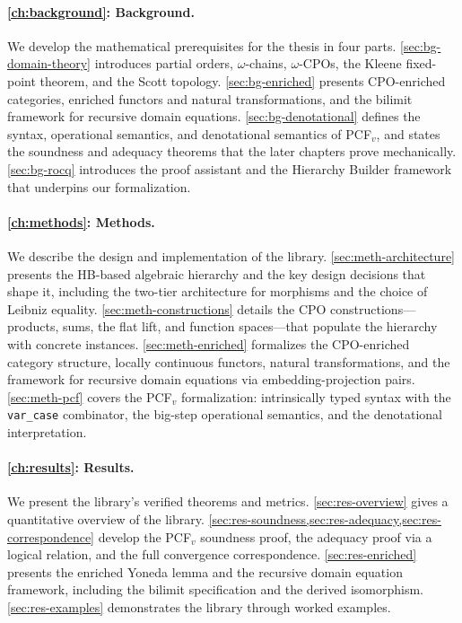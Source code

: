 \paragraph{\cref{ch:background}: Background.}
We develop the mathematical prerequisites for the thesis in four parts.
\cref{sec:bg-domain-theory} introduces partial orders, $\omega$-chains, $\omega$-CPOs, the Kleene
fixed-point theorem, and the Scott topology.
\cref{sec:bg-enriched} presents CPO-enriched categories, enriched functors and natural transformations,
and the bilimit framework for recursive domain equations.
\cref{sec:bg-denotational} defines the syntax, operational semantics, and denotational semantics of PCF$_v$, and
states the soundness and adequacy theorems that the later chapters prove mechanically.
\cref{sec:bg-rocq} introduces the \Rocq{} proof assistant and the Hierarchy Builder framework that
underpins our formalization.

\paragraph{\cref{ch:methods}: Methods.}
We describe the design and implementation of the library.
\cref{sec:meth-architecture} presents the HB-based algebraic hierarchy and the key design decisions
that shape it, including the two-tier architecture for morphisms and the choice of Leibniz equality.
\cref{sec:meth-constructions} details the CPO constructions---products, sums, the flat lift, and
function spaces---that populate the hierarchy with concrete instances.
\cref{sec:meth-enriched} formalizes the CPO-enriched category structure, locally continuous functors,
natural transformations, and the framework for recursive domain equations via embedding-projection
pairs.
\cref{sec:meth-pcf} covers the PCF$_v$ formalization: intrinsically typed syntax with the
\texttt{var\_case} combinator, the big-step operational semantics, and the denotational interpretation.

\paragraph{\cref{ch:results}: Results.}
We present the library's verified theorems and metrics.
\cref{sec:res-overview} gives a quantitative overview of the library.
\cref{sec:res-soundness,sec:res-adequacy,sec:res-correspondence} develop the PCF$_v$ soundness proof,
the adequacy proof via a logical relation, and the full convergence correspondence.
\cref{sec:res-enriched} presents the enriched Yoneda lemma and the recursive domain equation
framework, including the bilimit specification and the derived isomorphism.
\cref{sec:res-examples} demonstrates the library through worked examples.

